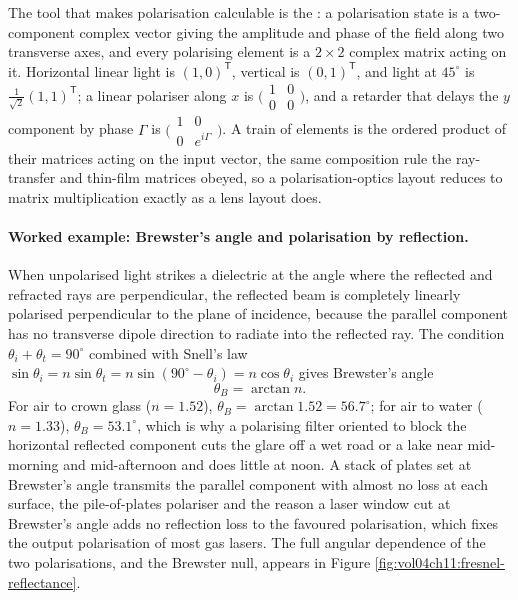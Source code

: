 The tool that makes polarisation calculable is the : a
polarisation state is a two-component complex vector giving the amplitude and
phase of the field along two transverse axes, and every polarising element is a
$2\times 2$ complex matrix acting on it. Horizontal linear light is
$(1,0)^{\mathsf{T}}$, vertical is $(0,1)^{\mathsf{T}}$, and light at
$45^{\circ}$ is $\tfrac{1}{\sqrt{2}}(1,1)^{\mathsf{T}}$; a linear polariser along
$x$ is $\big(\begin{smallmatrix} 1 & 0 \\ 0 & 0\end{smallmatrix}\big)$, and a
retarder that delays the $y$ component by phase $\Gamma$ is
$\big(\begin{smallmatrix} 1 & 0 \\ 0 & e^{i\Gamma}\end{smallmatrix}\big)$. A
train of elements is the ordered product of their matrices acting on the input
vector, the same composition rule the ray-transfer and thin-film matrices
obeyed, so a polarisation-optics layout reduces to matrix multiplication exactly
as a lens layout does.

\paragraph{Worked example: Brewster's angle and polarisation by reflection.}
When unpolarised light strikes a dielectric at the angle where the reflected and
refracted rays are perpendicular, the reflected beam is completely linearly
polarised perpendicular to the plane of incidence, because the parallel
component has no transverse dipole direction to radiate into the reflected ray.
The condition $\theta_i + \theta_t = 90^{\circ}$ combined with Snell's law
$\sin\theta_i = n\sin\theta_t = n\sin(90^{\circ} - \theta_i) = n\cos\theta_i$
gives Brewster's angle
\[
\theta_B = \arctan n .
\]
For air to crown glass ($n = 1.52$), $\theta_B = \arctan 1.52 = 56.7^{\circ}$;
for air to water ($n = 1.33$), $\theta_B = 53.1^{\circ}$, which is why a
polarising filter oriented to block the horizontal reflected component cuts the
glare off a wet road or a lake near mid-morning and mid-afternoon and does
little at noon. A stack of plates set at Brewster's angle transmits the parallel
component with almost no loss at each surface, the pile-of-plates polariser and
the reason a laser window cut at Brewster's angle adds no reflection loss to the
favoured polarisation, which fixes the output polarisation of most gas lasers.
The full angular dependence of the two polarisations, and the Brewster null,
appears in Figure \ref{fig:vol04ch11:fresnel-reflectance}.

